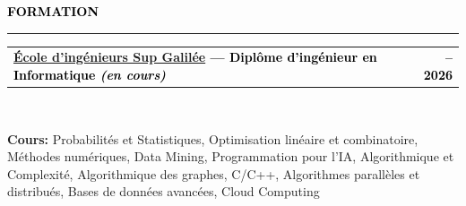 \documentclass[10pt,english,french]{article}
\makeatletter
\newcommand{\educationIcon}[1][black]{\textcolor{#1}{\faGraduationCap}}
\newlength{\mpwidth}
\newcommand{\cvsection}[1]{
    \vspace{4pt}
    \textbf{\fontsize{9pt}{10pt}\selectfont \textcolor{black}{#1}}
    \vspace{6pt}
    \hrule
    \vspace{6pt}
}
\newcommand{\cvtextnotab}[1]{
    \parbox{1\mpwidth}{#1}
}
\newcommand{\cvevent}[2]{
    \vspace{2pt}
    \parbox{\mpwidth}{
        \begin{tabular*}{1\mpwidth}{@{\extracolsep{\fill}} l r}
            \textcolor{black}{\textbf{\fontsize{11}{12}\selectfont #1}} & \textcolor{black}{\textbf{\fontsize{12}{12}\selectfont #2}} \\
        \end{tabular*}\\[-8pt] %
    }
}
\newcommand{\cvsubevent}[2]{
    \parbox{\mpwidth}{
        \begin{tabular*}{1\mpwidth}{@{\extracolsep{\fill}} l r}
            \textcolor{black}{\textit{\fontsize{10}{12}\selectfont #1}} & \textcolor{black}{\textit{\fontsize{10}{12}\selectfont #2}} \\
        \end{tabular*}\\[-8pt] %
    }
    \vspace{-10pt}
}
\makeatother
\begin{document}

\vspace{-5pt}
\cvsection{\educationIcon[black]\hspace{4pt}FORMATION}

\vspace{-3pt}
\cvevent{\href{https://www.sup-galilee.univ-paris13.fr/}{École d'ingénieurs Sup Galilée} --- Diplôme d'ingénieur en Informatique \textit{(en cours)}}{\fontsize{11pt}{11pt}\selectfont 2023\hspace{5pt}--\hspace{5pt}2026}

\vspace{-3pt}
\cvtextnotab{
    \textbf{Cours\!:}
    Probabilités et Statistiques, Optimisation linéaire et combinatoire,
    Méthodes numériques, Data Mining, Programmation pour l'IA,
    Algorithmique et Complexité, Algorithmique des graphes,
    C/C++, Algorithmes parallèles et distribués,
    Bases de données avancées, Cloud Computing
}


\end{document}
